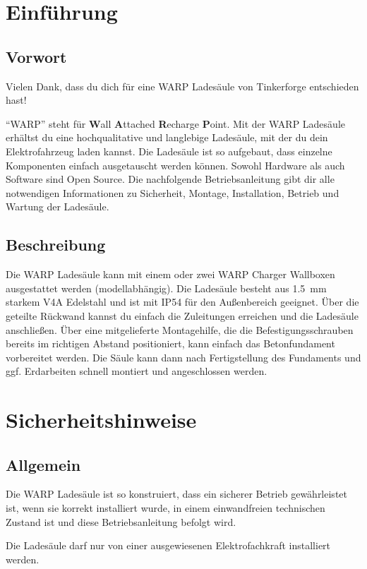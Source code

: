 \documentclass[a4paper,10pt]{article}
\newcommand{\hint}[1]{\begin{tcolorbox}[colback=boxgray,colframe=black,coltext=
white,title=Hinweis]#1\end{tcolorbox}}
\begin{document}
\begin{multicols*}{2}
	\tableofcontents \section{Einführung}
	\subsection{Vorwort} Vielen Dank, dass du
	dich für eine WARP Ladesäule von Tinkerforge entschieden hast!

	\enquote{WARP} steht
	für \textbf{W}all \textbf{A}ttached
	\textbf{R}echarge \textbf{P}oint. Mit der WARP Ladesäule
	erhältst du eine hochqualitative und langlebige Ladesäule, mit der du dein
	Elektrofahrzeug laden kannst. Die Ladesäule ist so aufgebaut, dass
	einzelne Komponenten einfach ausgetauscht werden können. Sowohl Hardware als
	auch Software sind Open Source. Die nachfolgende Betriebsanleitung gibt dir
	alle notwendigen Informationen zu Sicherheit, Montage, Installation, Betrieb
	und Wartung der Ladesäule.

	\subsection{Beschreibung}
	
	Die WARP Ladesäule kann mit einem oder zwei WARP Charger Wallboxen 
	ausgestattet werden (modellabhängig). Die Ladesäule besteht aus
	\SI{1.5}{\milli\meter} starkem V4A Edelstahl und ist mit IP54 für den
	Außenbereich geeignet. Über die geteilte Rückwand kannst du einfach
	die Zuleitungen erreichen und die Ladesäule anschließen. Über eine
	mitgelieferte Montagehilfe, die die Befestigungsschrauben bereits im
	richtigen Abstand positioniert, kann einfach das Betonfundament vorbereitet
	werden. Die Säule kann dann nach Fertigstellung des Fundaments und ggf.
	Erdarbeiten schnell montiert und angeschlossen werden.

	\section{Sicherheitshinweise}
	\subsection{Allgemein}
	Die WARP Ladesäule ist so konstruiert, dass ein sicherer Betrieb gewährleistet ist,
	wenn sie korrekt installiert wurde, in einem einwandfreien technischen Zustand
	ist und diese Betriebsanleitung befolgt wird. \hint{Die Ladesäule darf nur von einer ausgewiesenen Elektrofachkraft installiert
		werden.}


\end{multicols*}
\end{document}
